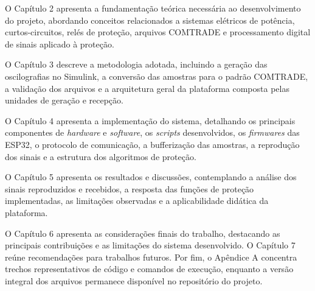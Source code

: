 O Capítulo 2 apresenta a fundamentação teórica necessária ao desenvolvimento do projeto, abordando conceitos relacionados a sistemas elétricos de potência, curtos-circuitos, relés de proteção, arquivos COMTRADE e processamento digital de sinais aplicado à proteção.

O Capítulo 3 descreve a metodologia adotada, incluindo a geração das oscilografias no Simulink, a conversão das amostras para o padrão COMTRADE, a validação dos arquivos e a arquitetura geral da plataforma composta pelas unidades de geração e recepção.

O Capítulo 4 apresenta a implementação do sistema, detalhando os principais componentes de \textit{hardware} e \textit{software}, os \textit{scripts} desenvolvidos, os \textit{firmwares} das ESP32, o protocolo de comunicação, a bufferização das amostras, a reprodução dos sinais e a estrutura dos algoritmos de proteção.

O Capítulo 5 apresenta os resultados e discussões, contemplando a análise dos sinais reproduzidos e recebidos, a resposta das funções de proteção implementadas, as limitações observadas e a aplicabilidade didática da plataforma.

O Capítulo 6 apresenta as considerações finais do trabalho, destacando as principais contribuições e as limitações do sistema desenvolvido. O Capítulo 7 reúne recomendações para trabalhos futuros. Por fim, o Apêndice A concentra trechos representativos de código e comandos de execução, enquanto a versão integral dos arquivos permanece disponível no repositório do projeto.
